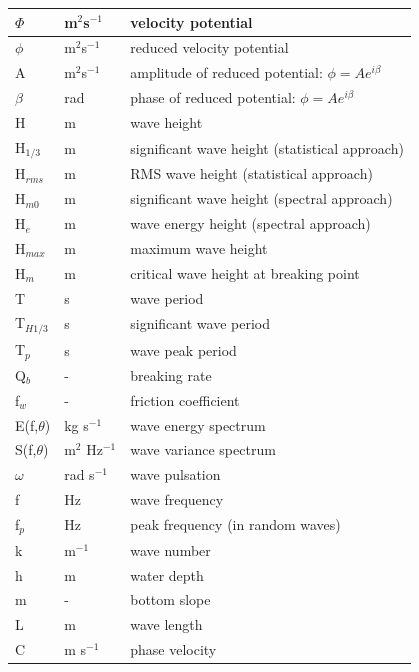 \begin{tabular}{|p{0.8in}|p{0.5in}|p{3.1in}|} \hline
  $\Phi$ & m${}^{2}$s${}^{-1}$ & velocity potential \\ \hline
  $\phi$ & m${}^{2}$s${}^{-1}$ & reduced velocity potential \\ \hline
  A & m${}^{2}$s${}^{-1}$ & amplitude of reduced potential: $\phi=A e^{i\beta}$ \\ \hline
  $\beta$ & rad & phase of reduced potential: $\phi=A e^{i\beta}$ \\ \hline
  H & m & wave height \\ \hline
  H${}_{1/3}$ & m & significant wave height (statistical approach) \\ \hline
  H${}_{rms}$ & m & RMS wave height (statistical approach) \\ \hline
  H${}_{m0}$ & m & significant wave height (spectral approach) \\ \hline
  H${}_{e}$ & m & wave energy height (spectral approach) \\ \hline
  H${}_{max}$ & m & maximum wave height \\ \hline
  H${}_{m}$ & m & critical wave height at breaking point \\ \hline
  T & s & wave period \\ \hline
  T${}_{H1/3}$ & s & significant wave period \\ \hline
  T${}_{p}$ & s & wave peak period \\ \hline
  Q${}_{b}$ & - & breaking rate \\ \hline
  f${}_{w}$ & - & friction coefficient\newline  \\ \hline
  E(f,$\theta$) & kg s${}^{-1}$ & wave energy spectrum \\ \hline
  S(f,$\theta$) & m${}^{2}$ Hz${}^{-1}$ & wave variance spectrum \\ \hline
  $\omega$ & rad s${}^{-1}$ & wave pulsation \\ \hline
  f & Hz & wave frequency \\ \hline
  f${}_{p}$ & Hz & peak frequency (in random waves) \\ \hline
  k & m${}^{-1}$ & wave number \\ \hline
  h & m & water depth \\ \hline
  m & - & bottom slope \\ \hline
  L & m & wave length \\ \hline
  C & m s${}^{-1}$ & phase velocity \\ \hline

\end{tabular}
